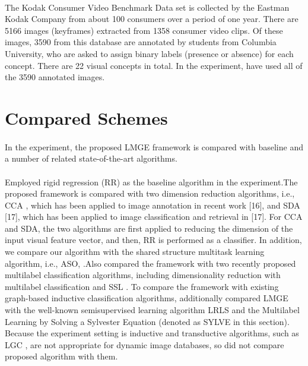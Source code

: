 \documentclass[a4paper,11pt]{report}
\begin{document}
\paragraph{}The Kodak Consumer Video Benchmark Data set is collected
by the Eastman Kodak Company from about 100 consumers
over a period of one year. There are 5166 images (keyframes)
extracted from 1358 consumer video clips. Of these images,
3590 from this database are annotated by students from Columbia
University, who are asked to assign binary labels (presence
or absence) for each concept. There are 22 visual concepts
in total. In the experiment,  have used all of the 3590 annotated
images.
\section{Compared Schemes}
\paragraph{}
In the experiment,  the proposed LMGE framework is compared
with baseline and a number of related state-of-the-art algorithms.



\paragraph{}
Employed rigid regression (RR) as the baseline algorithm
in the experiment.The proposed framework is compared with two dimension
reduction algorithms, i.e., CCA , which has been applied
to image annotation in recent work [16], and SDA [17],
which has been applied to image classification and retrieval in
[17]. For CCA and SDA, the two algorithms are first applied to
reducing the dimension of the input visual feature vector, and
then, RR is performed as a classifier. In addition, we compare
our algorithm with the shared structure multitask learning algorithm,
i.e., ASO, .Also compared the framework
with two recently proposed multilabel classification algorithms,
including dimensionality reduction with multilabel classification
 and SSL . To compare
the framework with existing graph-based inductive classification
algorithms,  additionally compared  LMGE with
the well-known semisupervised learning algorithm LRLS  and the Multilabel Learning by Solving a Sylvester
Equation  (denoted as SYLVE in this section).
Because the experiment setting is inductive and transductive algorithms,
such as LGC , are not appropriate for dynamic
image databases, so did not compare proposed algorithm with them.
\end{document}
